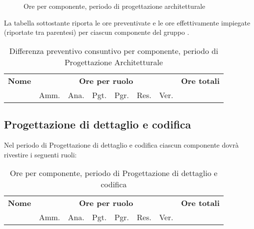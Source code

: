 \begin{figure}[H]
\caption{Ore per componente, periodo di progettazione architetturale}
\end{figure}

La tabella sottostante riporta le ore preventivate e le ore effettivamente impiegate (riportate tra parentesi) per ciascun componente del gruppo \GroupName{}.

\begin{center}
\begin{table}[H]
\begin{tabular}{lccccccc}
\toprule
    \textbf{Nome}  & \multicolumn{6}{c}{\textbf{Ore per ruolo}} & \textbf{Ore totali} \\
     & Amm. & Ana. & Pgt. & Pgr. & Res. & Ver. & \\
    \midrule
    
    	
    
    \bottomrule
\end{tabular}
\caption{Differenza preventivo consuntivo per componente, periodo di Progettazione Architetturale}
\end{table}
\end{center}

\pagebreak
\subsection{Progettazione di dettaglio e codifica}

Nel periodo di Progettazione di dettaglio e codifica ciascun componente dovrà rivestire i seguenti ruoli:

\begin{table}[H]
\centering
\begin{tabular}{lccccccc}
\toprule 
    \textbf{Nome}  & \multicolumn{6}{c}{\textbf{Ore per ruolo}} & \textbf{Ore totali}\\
     & Amm. & Ana. & Pgt. & Pgr. & Res. & Ver. \\
    \midrule

    	

    \bottomrule
\end{tabular}
\caption{Ore per componente, periodo di Progettazione di dettaglio e codifica}
\end{table}

